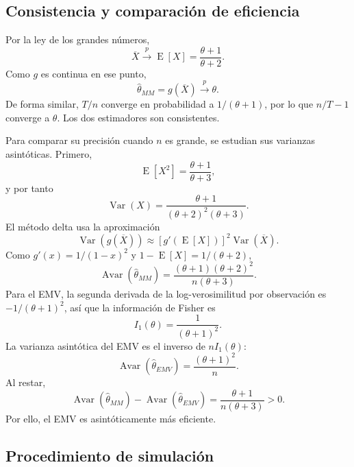 \documentclass[10pt,a4paper,oneside]{article}
\newcommand{\E}{\operatorname{E}}
\newcommand{\Var}{\operatorname{Var}}
\newcommand{\Avar}{\operatorname{Avar}}
\begin{document}
\subsection*{Consistencia y comparación de eficiencia}

Por la ley de los grandes números,
\begin{equation*}
\overline X\xrightarrow{p}\E[X]=\frac{\theta+1}{\theta+2}.
\end{equation*}
Como $g$ es continua en ese punto,
\begin{equation*}
\widehat\theta_{MM}=g(\overline X)\xrightarrow{p}\theta.
\end{equation*}
De forma similar, $T/n$ converge en probabilidad a $1/(\theta+1)$, por lo que $n/T-1$ converge a $\theta$. Los dos estimadores son consistentes.

Para comparar su precisión cuando $n$ es grande, se estudian sus varianzas asintóticas. Primero,
\begin{equation*}
\E[X^2]=\frac{\theta+1}{\theta+3},
\end{equation*}
y por tanto
\begin{equation*}
\Var(X)=
\frac{\theta+1}{(\theta+2)^2(\theta+3)}.
\end{equation*}
El método delta usa la aproximación
\begin{equation*}
\Var(g(\overline X))\approx[g'(\E[X])]^2\Var(\overline X).
\end{equation*}
Como $g'(x)=1/(1-x)^2$ y $1-\E[X]=1/(\theta+2)$,
\begin{equation*}
\Avar(\widehat\theta_{MM})
=\frac{(\theta+1)(\theta+2)^2}{n(\theta+3)}.
\end{equation*}
Para el EMV, la segunda derivada de la log-verosimilitud por observación es $-1/(\theta+1)^2$, así que la información de Fisher es
\begin{equation*}
I_1(\theta)=\frac{1}{(\theta+1)^2}.
\end{equation*}
La varianza asintótica del EMV es el inverso de $nI_1(\theta)$:
\begin{equation*}
\Avar(\widehat\theta_{EMV})=\frac{(\theta+1)^2}{n}.
\end{equation*}
Al restar,
\begin{equation*}
\Avar(\widehat\theta_{MM})-\Avar(\widehat\theta_{EMV})
=\frac{\theta+1}{n(\theta+3)}>0.
\end{equation*}
Por ello, el EMV es asintóticamente más eficiente.

\subsection*{Procedimiento de simulación}
\end{document}
